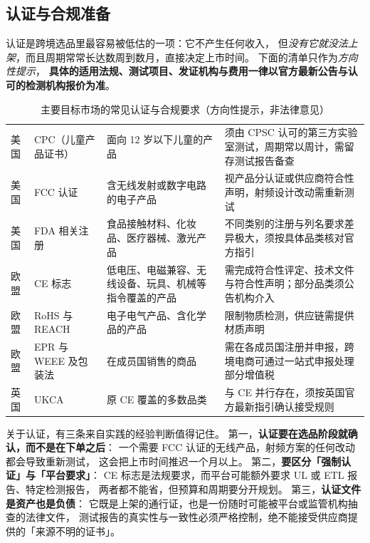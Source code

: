 \subsection{认证与合规准备}

认证是跨境选品里最容易被低估的一项：它不产生任何收入，
但\emph{没有它就没法上架}，而且周期常常长达数周到数月，直接决定上市时间。
下面的清单只作为\emph{方向性提示}，
\textbf{具体的适用法规、测试项目、发证机构与费用一律以官方最新公告与认可的检测机构报价为准}。

\begin{table}[htbp]
\centering
\caption{主要目标市场的常见认证与合规要求（方向性提示，非法律意见）}
\label{tab:sup-cert}
\small
\begin{tabularx}{\textwidth}{L{1.9cm} L{2.9cm} L{4.0cm} Y}
\toprule
{} &  &  &  \\
\midrule
美国 & CPC（儿童产品证书） & 面向 12 岁以下儿童的产品 & 须由 CPSC 认可的第三方实验室测试，周期常以周计，需留存测试报告备查 \\
美国 & FCC 认证 & 含无线发射或数字电路的电子产品 & 视产品分认证或供应商符合性声明，射频设计改动需重新测试 \\
美国 & FDA 相关注册 & 食品接触材料、化妆品、医疗器械、激光产品 & 不同类别的注册与列名要求差异极大，须按具体品类核对官方指引 \\
欧盟 & CE 标志 & 低电压、电磁兼容、无线设备、玩具、机械等指令覆盖的产品 & 需完成符合性评定、技术文件与符合性声明；部分品类须公告机构介入 \\
欧盟 & RoHS 与 REACH & 电子电气产品、含化学品的产品 & 限制物质检测，供应链需提供材质声明 \\
欧盟 & EPR 与 WEEE 及包装法 & 在成员国销售的商品 & 需在各成员国注册并申报，跨境电商可通过一站式申报处理部分增值税 \cite{eu_oss} \\
英国 & UKCA & 原 CE 覆盖的多数品类 & 与 CE 并行存在，须按英国官方最新指引确认接受规则 \\
\bottomrule
\end{tabularx}
\end{table}

关于认证，有三条来自实践的经验判断值得记住。
第一，\textbf{认证要在选品阶段就确认，而不是在下单之后}：
一个需要 FCC 认证的无线产品，射频方案的任何改动都会导致重新测试，
这会把上市时间推迟一个月以上。
第二，\textbf{要区分「强制认证」与「平台要求」}：
CE 标志是法规要求，而平台可能额外要求 UL 或 ETL 报告、特定检测报告，
两者都不能省，但预算和周期要分开规划。
第三，\textbf{认证文件是资产也是负债}：
它既是上架的通行证，也是一份随时可能被平台或监管机构抽查的法律文件，
测试报告的真实性与一致性必须严格控制，绝不能接受供应商提供的「来源不明的证书」。

